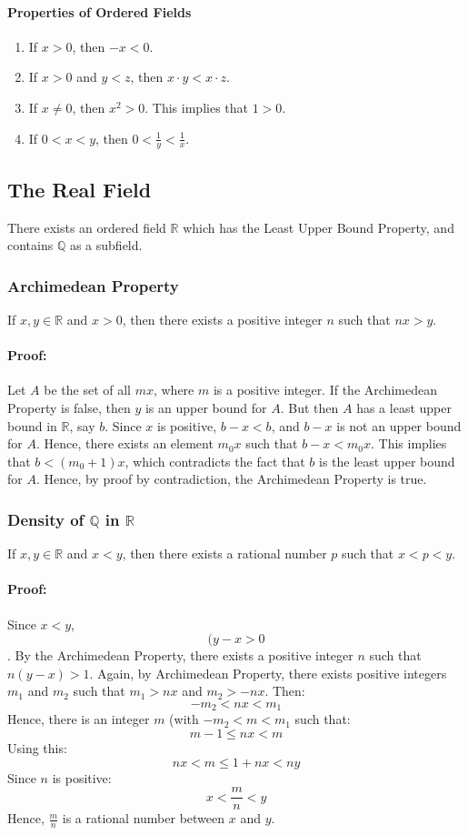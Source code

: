 \documentclass[12pt, oneside]{book}
\begin{document}
\paragraph{Properties of Ordered Fields}
\begin{enumerate}
    \item If \(x > 0\), then \(-x < 0\).
    \item If \(x > 0\) and \(y < z\), then \(x \cdot y < x \cdot z\).
    \item If \(x \neq 0\), then \(x^2 > 0\).
    This implies that \(1 > 0\).
    \item If \(0 < x < y\), then \(0 < \frac{1}{y} < \frac{1}{x}\).
\end{enumerate}

\subsection{The Real Field}
There exists an ordered field \(\mathbb{R}\) which has the Least Upper Bound Property, and contains \(\mathbb{Q}\) as a subfield.

\subsubsection{Archimedean Property}
If \(x,y \in \mathbb{R}\) and \(x > 0\), then there exists a positive integer \(n\) such that \(nx > y\).

\paragraph{Proof:} Let \(A\) be the set of all \(mx\), where \(m\) is a positive integer.
If the Archimedean Property is false, then \(y\) is an upper bound for \(A\).
But then \(A\) has a least upper bound in \( \mathbb{R} \), say \(b\).
Since \(x\) is positive, \(b-x<b\), and \(b-x\) is not an upper bound for \(A\).
Hence, there exists an element \(m_0x\) such that \(b-x < m_0x\).
This implies that \(b < (m_0+1)x\), which contradicts the fact that \(b\) is the least upper bound for \(A\).
Hence, by proof by contradiction, the Archimedean Property is true.

\subsubsection{Density of \(\mathbb{Q}\) in \(\mathbb{R}\)}
If \(x,y \in \mathbb{R}\) and \(x < y\), then there exists a rational number \(p\) such that \(x < p < y\).

\paragraph{Proof:} Since \(x<y\), \[(y-x > 0\].
By the Archimedean Property, there exists a positive integer \(n\) such that \(n(y-x) > 1\).
Again, by Archimedean Property, there exists positive integers \(m_1\) and \(m_2\) such that \(m_1 > nx\) and \(m_2 > -nx\).
Then: \[ -m_2 < nx < m_1 \]
Hence, there is an integer \(m\) (with \( -m_2 < m < m_1 \) such that:
\[ m-1 \leq nx < m \]
Using this:
\[ nx < m \leq 1+nx <ny \]
Since \(n\) is positive:
\[ x < \frac{m}{n} < y \]
Hence, \(\frac{m}{n}\) is a rational number between \(x\) and \(y\).
\end{document}
